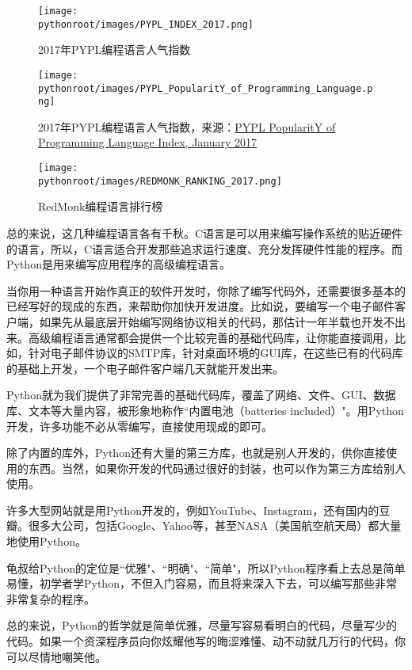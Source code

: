 \begin{figure}[ht]
  \centering
  \texttt{[image: \\pythonroot/images/PYPL\_INDEX\_2017.png]}
  \caption{2017年PYPL编程语言人气指数}
  \label{fig:PYPL_INDEX_2017}
\end{figure}

\begin{figure}[ht]
  \centering
  \texttt{[image: \\pythonroot/images/PYPL\_PopularitY\_of\_Programming\_Language.png]}
  \caption{2017年PYPL编程语言人气指数，来源：\href{http://pypl.github.io/PYPL.html}{PYPL PopularitY of Programming Language Index, January 2017}}
  \label{fig:PYPL_PopularitY_of_Programming_Language}
\end{figure}

\begin{figure}[ht]
  \centering
  \texttt{[image: \\pythonroot/images/REDMONK\_RANKING\_2017.png]}
  \caption{RedMonk编程语言排行榜}
  \label{fig:REDMONK_RANKING_2017}
\end{figure}

总的来说，这几种编程语言各有千秋。C语言是可以用来编写操作系统的贴近硬件的语言，所以，C语言适合开发那些追求运行速度、充分发挥硬件性能的程序。而Python是用来编写应用程序的高级编程语言。

当你用一种语言开始作真正的软件开发时，你除了编写代码外，还需要很多基本的已经写好的现成的东西，来帮助你加快开发进度。比如说，要编写一个电子邮件客户端，如果先从最底层开始编写网络协议相关的代码，那估计一年半载也开发不出来。高级编程语言通常都会提供一个比较完善的基础代码库，让你能直接调用，比如，针对电子邮件协议的SMTP库，针对桌面环境的GUI库，在这些已有的代码库的基础上开发，一个电子邮件客户端几天就能开发出来。

Python就为我们提供了非常完善的基础代码库，覆盖了网络、文件、GUI、数据库、文本等大量内容，被形象地称作``内置电池（batteries included）"。用Python开发，许多功能不必从零编写，直接使用现成的即可。

除了内置的库外，Python还有大量的第三方库，也就是别人开发的，供你直接使用的东西。当然，如果你开发的代码通过很好的封装，也可以作为第三方库给别人使用。

许多大型网站就是用Python开发的，例如YouTube、Instagram，还有国内的豆瓣。很多大公司，包括Google、Yahoo等，甚至NASA（美国航空航天局）都大量地使用Python。

龟叔给Python的定位是``优雅"、``明确"、``简单"，所以Python程序看上去总是简单易懂，初学者学Python，不但入门容易，而且将来深入下去，可以编写那些非常非常复杂的程序。

总的来说，Python的哲学就是简单优雅，尽量写容易看明白的代码，尽量写少的代码。如果一个资深程序员向你炫耀他写的晦涩难懂、动不动就几万行的代码，你可以尽情地嘲笑他。


